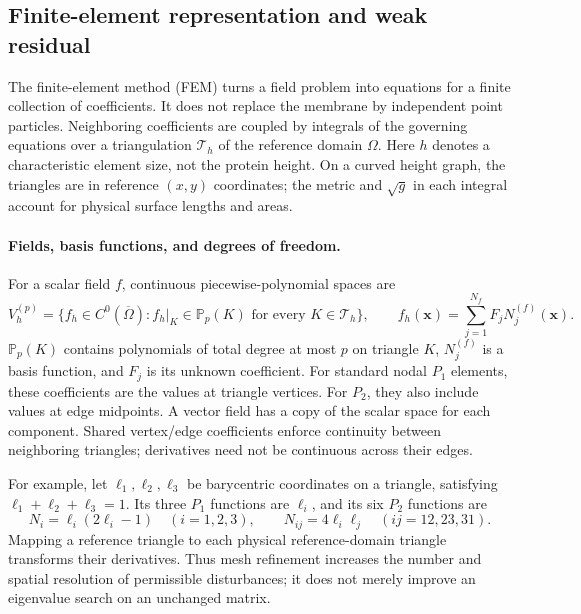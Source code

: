 \subsection{Finite-element representation and weak residual}
\label{sec:fem-detail}
The finite-element method (FEM) turns a field problem into equations for a finite collection of coefficients. It does not replace the membrane by independent point particles. Neighboring coefficients are coupled by integrals of the governing equations over a triangulation $\mathcal T_h$ of the reference domain $\Omega$. Here $h$ denotes a characteristic element size, not the protein height. On a curved height graph, the triangles are in reference $(x,y)$ coordinates; the metric and $\sqrt g$ in each integral account for physical surface lengths and areas.

\paragraph{Fields, basis functions, and degrees of freedom.}
For a scalar field $f$, continuous piecewise-polynomial spaces are
\begin{equation}
V_h^{(p)}=\{f_h\in C^0(\overline\Omega):f_h|_K\in\mathbb P_p(K)
\text{ for every }K\in\mathcal T_h\},\qquad
f_h(\bm x)=\sum_{j=1}^{N_f}F_jN_j^{(f)}(\bm x).
\label{eq:fem-space}
\end{equation}
$\mathbb P_p(K)$ contains polynomials of total degree at most $p$ on triangle $K$, $N_j^{(f)}$ is a basis function, and $F_j$ is its unknown coefficient. For standard nodal $P_1$ elements, these coefficients are the values at triangle vertices. For $P_2$, they also include values at edge midpoints. A vector field has a copy of the scalar space for each component. Shared vertex/edge coefficients enforce continuity between neighboring triangles; derivatives need not be continuous across their edges.

For example, let $\ell_1,\ell_2,\ell_3$ be barycentric coordinates on a triangle, satisfying $\ell_1+\ell_2+\ell_3=1$. Its three $P_1$ functions are $\ell_i$, and its six $P_2$ functions are
\begin{equation}
N_i=\ell_i(2\ell_i-1)\quad(i=1,2,3),\qquad
N_{ij}=4\ell_i\ell_j\quad(ij=12,23,31).
\end{equation}
Mapping a reference triangle to each physical reference-domain triangle transforms their derivatives. Thus mesh refinement increases the number and spatial resolution of permissible disturbances; it does not merely improve an eigenvalue search on an unchanged matrix.

